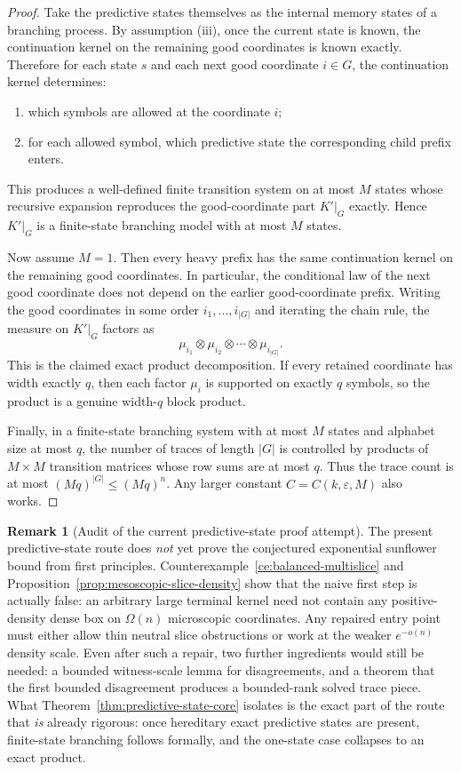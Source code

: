 \documentclass[11pt]{article}
\theoremstyle{definition}
\newtheorem{remark}[theorem]{Remark}
\newcommand{\eps}{\varepsilon}
\newcommand{\1}{\mathbf{1}}
\begin{document}
\begin{proof}
Take the predictive states themselves as the internal memory states of a branching process. By assumption (iii), once the current state is known, the continuation kernel on the remaining good coordinates is known exactly. Therefore for each state $s$ and each next good coordinate $i\in G$, the continuation kernel determines:
\begin{enumerate}[label=(\alph*),leftmargin=2.2em]
\item which symbols are allowed at the coordinate $i$;
\item for each allowed symbol, which predictive state the corresponding child prefix enters.
\end{enumerate}
This produces a well-defined finite transition system on at most $M$ states whose recursive expansion reproduces the good-coordinate part $K'|_G$ exactly. Hence $K'|_G$ is a finite-state branching model with at most $M$ states.

Now assume $M=1$. Then every heavy prefix has the same continuation kernel on the remaining good coordinates. In particular, the conditional law of the next good coordinate does not depend on the earlier good-coordinate prefix. Writing the good coordinates in some order $i_1,\dots,i_{|G|}$ and iterating the chain rule, the measure on $K'|_G$ factors as
\[
\mu_{i_1}\otimes \mu_{i_2}\otimes \cdots \otimes \mu_{i_{|G|}}.
\]
This is the claimed exact product decomposition. If every retained coordinate has width exactly $q$, then each factor $\mu_i$ is supported on exactly $q$ symbols, so the product is a genuine width-$q$ block product.

Finally, in a finite-state branching system with at most $M$ states and alphabet size at most $q$, the number of traces of length $|G|$ is controlled by products of $M\times M$ transition matrices whose row sums are at most $q$. Thus the trace count is at most $(Mq)^{|G|}\le (Mq)^n$. Any larger constant $C=C(k,\eps,M)$ also works.
\end{proof}

\begin{remark}[Audit of the current predictive-state proof attempt]\label{rem:predictive-state-audit}
The present predictive-state route does \emph{not} yet prove the conjectured exponential sunflower bound from first principles. Counterexample~\ref{ce:balanced-multislice} and Proposition~\ref{prop:mesoscopic-slice-density} show that the naive first step is actually false: an arbitrary large terminal kernel need not contain any positive-density dense box on $\Omega(n)$ microscopic coordinates. Any repaired entry point must either allow thin neutral slice obstructions or work at the weaker $e^{-o(n)}$ density scale. Even after such a repair, two further ingredients would still be needed: a bounded witness-scale lemma for disagreements, and a theorem that the first bounded disagreement produces a bounded-rank solved trace piece. What Theorem~\ref{thm:predictive-state-core} isolates is the exact part of the route that \emph{is} already rigorous: once hereditary exact predictive states are present, finite-state branching follows formally, and the one-state case collapses to an exact product.
\end{remark}
\end{document}
